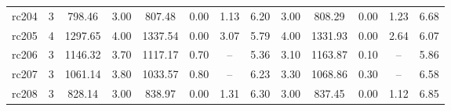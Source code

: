 \begin{longtable}{lcccccccccccc}
rc204 & 3 & 798.46 & 3.00 & 807.48 & 0.00 & 1.13 & 6.20 & 3.00 & 808.29 & 0.00 & 1.23 & 6.68 \\
rc205 & 4 & 1297.65 & 4.00 & 1337.54 & 0.00 & 3.07 & 5.79 & 4.00 & 1331.93 & 0.00 & 2.64 & 6.07 \\
rc206 & 3 & 1146.32 & 3.70 & 1117.17 & 0.70 & -- & 5.36 & 3.10 & 1163.87 & 0.10 & -- & 5.86 \\
rc207 & 3 & 1061.14 & 3.80 & 1033.57 & 0.80 & -- & 6.23 & 3.30 & 1068.86 & 0.30 & -- & 6.58 \\
rc208 & 3 & 828.14 & 3.00 & 838.97 & 0.00 & 1.31 & 6.30 & 3.00 & 837.45 & 0.00 & 1.12 & 6.85 \\
\end{longtable}
